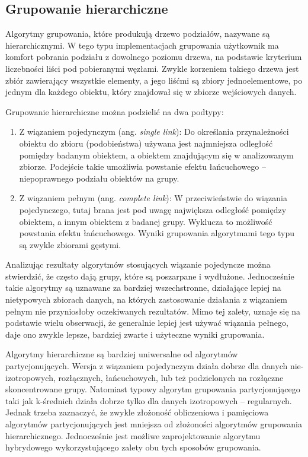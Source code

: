 \documentclass{article}
\begin{document}
\subsection{Grupowanie hierarchiczne} 
\label{subsec:grupHier}
Algorytmy grupowania, które produkują drzewo podziałów, nazywane są hierarchicznymi. W tego typu implementacjach grupowania użytkownik ma komfort pobrania podziału z dowolnego poziomu drzewa, na podstawie kryterium liczebności liści pod pobieranymi węzłami. Zwykle korzeniem takiego drzewa jest zbiór zawierający wszystkie elementy, a jego liśćmi są zbiory jednoelementowe, po jednym dla każdego obiektu, który znajdował się w zbiorze wejściowych danych.

Grupowanie hierarchiczne można podzielić na dwa podtypy:

\begin{enumerate}
	\item Z wiązaniem pojedynczym (ang. \textit{single link}):
	Do określania przynależności obiektu do zbioru (podobieństwa) używana jest najmniejsza odległość pomiędzy badanym obiektem, a obiektem znajdującym się w analizowanym zbiorze. Podejście takie umożliwia powstanie efektu łańcuchowego – niepoprawnego podziału obiektów na grupy.
	\item Z wiązaniem pełnym (ang. \textit{complete link}): 
	W przeciwieństwie do wiązania pojedynczego, tutaj brana jest pod uwagę największa odległość pomiędzy obiektem, a innym obiektem z badanej grupy. Wyklucza to możliwość powstania efektu łańcuchowego. Wyniki grupowania algorytmami tego typu są zwykle zbiorami gęstymi.
\end{enumerate}

Analizując rezultaty algorytmów stosujących wiązanie pojedyncze można stwierdzić, że często dają grupy, które są poszarpane i wydłużone. Jednocześnie takie algorytmy są uznawane za bardziej wszechstronne, działające lepiej na nietypowych zbiorach danych\cite[5.1, p.~276]{jain_clustering}, na których zastosowanie działania z wiązaniem pełnym nie przyniosłoby oczekiwanych rezultatów. Mimo tej zalety, uznaje się na podstawie wielu obserwacji\cite{jain_clustering}, że generalnie lepiej jest używać wiązania pełnego, daje ono zwykle lepsze, bardziej zwarte i użyteczne wyniki grupowania.

Algorytmy hierarchiczne są bardziej uniwersalne od algorytmów partycjonujących\cite[5.1 p.~277]{jain_clustering}. Wersja z wiązaniem pojedynczym działa dobrze dla danych nie-izotropowych, rozłącznych, łańcuchowych, lub też podzielonych na rozłączne skoncentrowane grupy. Natomiast typowy algorytm grupowania partycjonującego taki jak k-średnich działa dobrze tylko dla danych izotropowych – regularnych. Jednak trzeba zaznaczyć, że zwykle złożoność obliczeniowa i pamięciowa algorytmów partycjonujących jest mniejsza od złożoności algorytmów grupowania hierarchicznego. Jednocześnie jest możliwe zaprojektowanie algorytmu hybrydowego wykorzystującego zalety obu tych sposobów grupowania\cite[5.1, p.~277]{jain_clustering}. 
\end{document}
